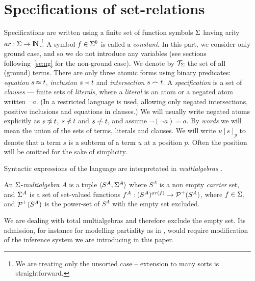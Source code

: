 \section{Specifications of set-relations} \label{se:nd-specs}

Specifications are written using a finite set of function symbols $\Sigma$
having arity $ar:\Sigma\to {{\rm I\!N}}$.\footnote
{We are treating only the unsorted case --
extension to many sorts is straightforward.}
A symbol $f\in\Sigma^0$ %
is called a {\em constant}. In this part, we consider only ground case, and so we do not
introduce any variables (see sections following~\ref{se:ng} for the non-ground case).  
We denote by ${\cal T}_\Sigma$ the set of all (ground)
terms.  There are only three atomic forms using binary predicates: {\em
equation} $s\mathbin{\approx} t$, {\em inclusion} $s\mathbin{\prec} t$ and {\em intersection} $s\mathbin{\frown}
t$. A {\em specification} is a set of {\em clauses}
--- finite sets of {\em
literals}, where a {\em literal} is an atom or a negated atom written \(\neg 
a\).
 (In \cite{MW,Mich} a 
restricted language is used, allowing only negated intersections, positive 
inclusions and equations in clauses.) We will usually write negated atoms 
explicitly as $s\notEq t$, $s\notIncl t$ and $s\notInt t$, and 
assume \(\neg(\neg a)=a\).
%
By
{\em words} we will mean the union of the sets of terms, literals and
clauses.  We will write $u[s]_p$ to denote that a term $s$ is a subterm of a
term $u$ at a position $p$. Often the position will be omitted for the sake of
simplicity.
%

Syntactic expressions of the language are interpretated in {\em multialgebras}
\cite{Kap,Hus,Mich}.
\begin{DEFINITION}
An $\Sigma$-{\em multialgebra} $A$ is a tuple \(\langle S^A,\Sigma^A\rangle\) where $S^A$
is a non empty {\em carrier} set, and $\Sigma^A$ is a set of set-valued functions
\(f^A: (S^A)^{ar(f)}\to\mbox {$\cal P$}^+(S^A)\), where \(f\in \Sigma\), and \(\mbox {$\cal P$}^+(S^A)\)
is the power-set of \(S^A\) with the empty set excluded.
\end{DEFINITION}
We are dealing with total multialgebras and therefore exclude the empty set.
Its admission, for instance for modelling partiality as in \cite{BK},
would require modification of the
inference system we are introducing in this paper.

